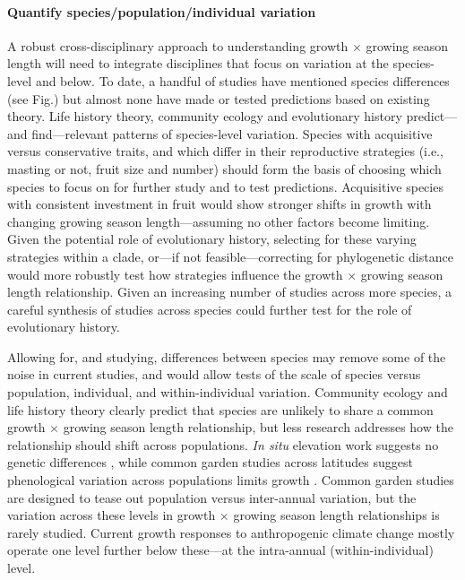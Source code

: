 \documentclass[11pt]{article}
\begin{document}
\paragraph{Quantify species/population/individual variation} %

A robust cross-disciplinary approach to understanding growth $\times$ growing season length will need to integrate disciplines that focus on variation at the species-level and below. To date, a handful of studies have mentioned species differences (see Fig.) but almost none have made or tested predictions based on existing theory. Life history theory, community ecology and evolutionary history predict---and find---relevant patterns of species-level variation. Species with acquisitive versus conservative traits, and which differ in their reproductive strategies (i.e., masting or not, fruit size and number) should form the basis of choosing which species to focus on for further study and to test predictions. Acquisitive species with consistent investment in fruit would show stronger shifts in growth with changing growing season length---assuming no other factors become limiting. Given the potential role of evolutionary history, selecting for these varying strategies within a clade, or---if not feasible---correcting for phylogenetic distance would more robustly test how strategies influence the growth $\times$ growing season length relationship. Given an increasing number of studies across more species, a careful synthesis of studies across species could further test for the role of evolutionary history. 

Allowing for, and studying, differences between species may remove some of the noise in current studies, and would allow tests of the scale of species versus population, individual, and within-individual variation. Community ecology and life history theory clearly predict that species are unlikely to share a common growth $\times$ growing season length relationship, but less research addresses how the relationship should shift across populations. \emph{In situ} elevation work suggests no genetic differences \citep{king2013tree}, while common garden studies across latitudes suggest phenological variation across populations limits growth \citep[][though most work is not comparable as common garden studies rarely report annual ring width]{soolanayakanahally2013timing}. Common garden studies are designed to tease out population versus inter-annual variation, but the variation across these levels in growth $\times$ growing season length relationships is rarely studied. Current growth responses to anthropogenic climate change mostly operate one level further below these---at the intra-annual (within-individual) level. 
\end{document}
